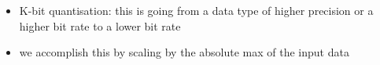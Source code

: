 \documentclass[11pt]{article}
\begin{document}
\begin{minipage}[l]{.5\linewidth}
    \begin{figure}[H]
        \centering
    \end{figure}    
\end{minipage}\hfill
\begin{minipage}[r]{.48\linewidth}
    \begin{itemize}
        \item K-bit quantisation: this is going from a data type of higher precision or a higher bit rate to a lower bit rate
        \item we accomplish this by scaling by the absolute max of the input data
    \end{itemize}
\end{minipage}
\end{document}

